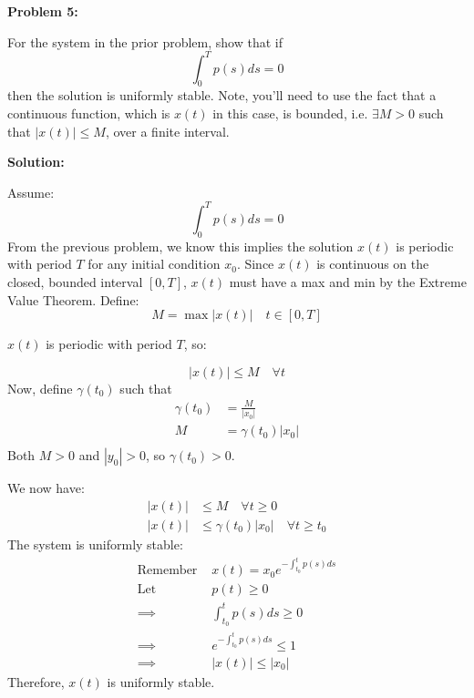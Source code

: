 \documentclass[12pt]{article}
\newenvironment{problem}[1]{
    \textbf{Problem #1:}
}{
    \rmfamily \vspace{1em}
}
\newenvironment{solution}{
    \textbf{Solution:}
    
}{
    
    \vspace{2em}
}
\begin{document}
\begin{problem}{5}
For the system in the prior problem, show that if
    \[
        \int_{0}^T p(s)ds = 0
    \]
then the solution is uniformly stable. Note, you’ll need to use the fact that a continuous function, which is \(x(t)\) in this case, is bounded, i.e. \(\exists M > 0\) such that \(|x(t)| \leq M\), over a finite interval.
\end{problem}

\begin{solution}
Assume:
    \[
        \int_{0}^T p(s)ds = 0
    \]
From the previous problem, we know this implies the solution \(x(t)\) is periodic with period \(T\) for any initial condition \(x_0\). Since \(x(t)\) is continuous on the closed, bounded interval \([0, T]\), \(x(t)\) must have a max and min by the Extreme Value Theorem. Define:
    \[
        M = \max |x(t)| \quad  t \in [0, T]
    \]
    
\(x(t)\) is periodic with period \(T\), so:
    
    \[
        |x(t)| \leq M \quad \forall t
    \]
Now, define \(\gamma(t_0)\) such that
    \[
        \begin{aligned}
            \gamma(t_0) &= \frac{M}{|x_0|}\\
            M &= \gamma(t_0) |x_0|\\
        \end{aligned}
    \]
Both \(M > 0\) and \(|y_0| > 0\), so \(\gamma(t_0) > 0\).

We now have:
    \[
        \begin{aligned}
            |x(t)| &\leq M \quad \forall t \geq 0\\
            |x(t)| &\leq \gamma(t_0) |x_0| \quad \forall t \geq t_0
        \end{aligned}
    \]
The system is uniformly stable:
    \[
        \begin{aligned}
            \text{Remember } &x(t) = x_0 e^{-\int_{t_0}^{t} p(s)  ds}\\
            \text{Let } &p(t) \geq 0\\
            \implies &\int_{t_0}^t p(s)ds \geq 0\\
            \implies &e^{-\int_{t_0}^t p(s)ds} \leq 1\\
            \implies &|x(t)| \leq |x_0|
        \end{aligned}
    \]
Therefore, \(x(t)\) is uniformly stable.


\end{solution}
\end{document}
